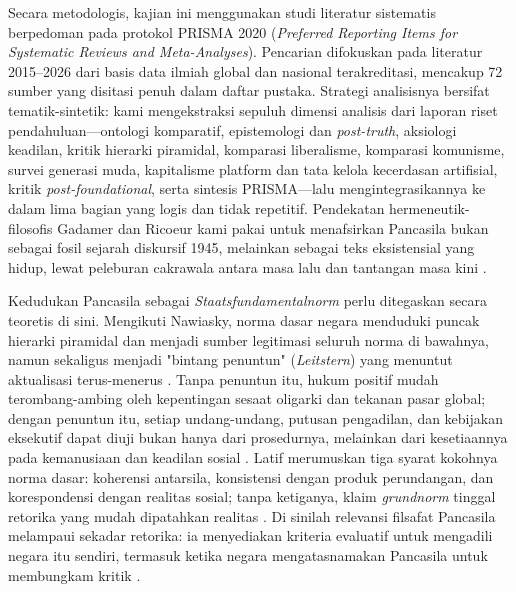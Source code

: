 \documentclass[journal]{IEEEtran}
\begin{document}
Secara metodologis, kajian ini menggunakan studi literatur sistematis berpedoman pada protokol PRISMA 2020 (\textit{Preferred Reporting Items for Systematic Reviews and Meta-Analyses}). Pencarian difokuskan pada literatur 2015--2026 dari basis data ilmiah global dan nasional terakreditasi, mencakup 72 sumber yang disitasi penuh dalam daftar pustaka. Strategi analisisnya bersifat tematik-sintetik: kami mengekstraksi sepuluh dimensi analisis dari laporan riset pendahuluan---ontologi komparatif, epistemologi dan \textit{post-truth}, aksiologi keadilan, kritik hierarki piramidal, komparasi liberalisme, komparasi komunisme, survei generasi muda, kapitalisme platform dan tata kelola kecerdasan artifisial, kritik \textit{post-foundational}, serta sintesis PRISMA---lalu mengintegrasikannya ke dalam lima bagian yang logis dan tidak repetitif. Pendekatan hermeneutik-filosofis Gadamer dan Ricoeur kami pakai untuk menafsirkan Pancasila bukan sebagai fosil sejarah diskursif 1945, melainkan sebagai teks eksistensial yang hidup, lewat peleburan cakrawala antara masa lalu dan tantangan masa kini \cite{gadamer2004,ricoeur1981}.

Kedudukan Pancasila sebagai \textit{Staatsfundamentalnorm} perlu ditegaskan secara teoretis di sini. Mengikuti Nawiasky, norma dasar negara menduduki puncak hierarki piramidal dan menjadi sumber legitimasi seluruh norma di bawahnya, namun sekaligus menjadi "bintang penuntun" (\textit{Leitstern}) yang menuntut aktualisasi terus-menerus \cite{nawiasky1948,assiddiqie2006}. Tanpa penuntun itu, hukum positif mudah terombang-ambing oleh kepentingan sesaat oligarki dan tekanan pasar global; dengan penuntun itu, setiap undang-undang, putusan pengadilan, dan kebijakan eksekutif dapat diuji bukan hanya dari prosedurnya, melainkan dari kesetiaannya pada kemanusiaan dan keadilan sosial \cite{aswandi2019,mahfud2009}. Latif merumuskan tiga syarat kokohnya norma dasar: koherensi antarsila, konsistensi dengan produk perundangan, dan korespondensi dengan realitas sosial; tanpa ketiganya, klaim \textit{grundnorm} tinggal retorika yang mudah dipatahkan realitas \cite{latifbphn}. Di sinilah relevansi filsafat Pancasila melampaui sekadar retorika: ia menyediakan kriteria evaluatif untuk mengadili negara itu sendiri, termasuk ketika negara mengatasnamakan Pancasila untuk membungkam kritik \cite{kim2024,suntana2023}.
\end{document}
